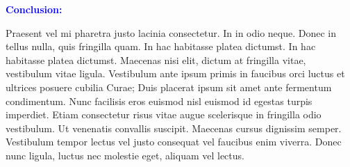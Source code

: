 \documentclass{article}
\newcommand{\statement}[1]{\par\medskip
  \textcolor{blue}{\textbf{#1:}}\space
}
\begin{document}
\statement{Conclusion}
Praesent vel mi pharetra justo lacinia consectetur. In in odio neque.
Donec in tellus nulla, quis fringilla quam. In hac habitasse platea
dictumst. In hac habitasse platea dictumst. Maecenas nisi elit, dictum
at fringilla vitae, vestibulum vitae ligula. Vestibulum ante ipsum
primis in faucibus orci luctus et ultrices posuere cubilia Curae; Duis
placerat ipsum sit amet ante fermentum condimentum. Nunc facilisis
eros euismod nisl euismod id egestas turpis imperdiet. Etiam
consectetur risus vitae augue scelerisque in fringilla odio
vestibulum. Ut venenatis convallis suscipit. Maecenas cursus dignissim
semper. Vestibulum tempor lectus vel justo consequat vel faucibus enim
viverra. Donec nunc ligula, luctus nec molestie eget, aliquam vel
lectus.



\end{document}
